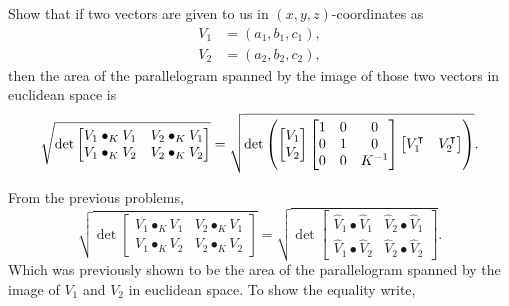 \documentclass{ximera}
\begin{document}
\begin{problem}
  
Show that if two vectors are given to us in $(x,y,z)$-coordinates as%
\begin{align*}
V_{1}  &  =\left(  a_{1},b_{1},c_{1}\right), \\
V_{2}  &  =\left(  a_{2},b_{2},c_{2}\right),
\end{align*}
then the area of the parallelogram spanned by the image of those two vectors in euclidean
space is%
\[
\sqrt{\det
\begin{bmatrix}
V_{1}\bullet_{K}V_{1} & V_{2}\bullet_{K}V_{1}\\
V_{1}\bullet_{K}V_{2} & V_{2}\bullet_{K}V_{2}%
\end{bmatrix}}
=\sqrt{\det\left( 
\begin{bmatrix}
V_{1} \\
V_{2}
\end{bmatrix}
\begin{bmatrix}
1 & 0 & 0\\
0 & 1 & 0\\
0 & 0 & K^{-1}%
\end{bmatrix}
\begin{bmatrix}
V_{1}^\transpose & V_{2}^\transpose%
\end{bmatrix}
\right) }.
\]


\begin{freeResponse} From the previous problems,
\[
\sqrt{\det
\begin{bmatrix}
V_{1}\bullet_{K}V_{1} & V_{2}\bullet_{K}V_{1}\\
V_{1}\bullet_{K}V_{2} & V_{2}\bullet_{K}V_{2}%
\end{bmatrix}}
=
\sqrt{\det
\begin{bmatrix}
\hat{V}_{1}\bullet \hat{V}_{1} & \hat{V}_{2}\bullet \hat{V}_{1}\\
\hat{V}_{1}\bullet \hat{V}_{2} & \hat{V}_{2}\bullet \hat{V}_{2}%
\end{bmatrix}}.
\]
Which was previously shown to be the area of the parallelogram spanned by the image of $V_1$ and $V_2$ in euclidean space. To show the equality write,


\end{freeResponse}
\end{problem}
\end{document}
